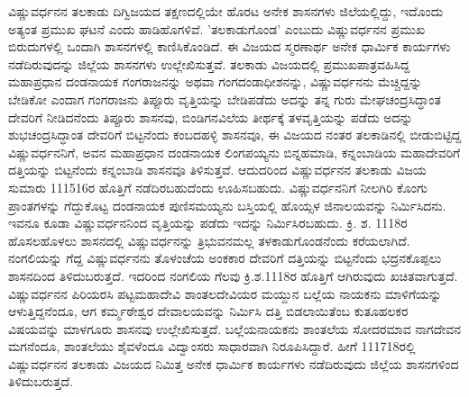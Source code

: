 ವಿಷ್ಣುವರ್ಧನನ ತಲಕಾಡು ದಿಗ್ವಿಜಯದ ತಕ್ಷಣದಲ್ಲಿಯೇ ಹೊರಟ ಅನೇಕ ಶಾಸನಗಳು ಜಿಲೆಯಲ್ಲಿದ್ದು, ಇದೊಂದು ಅತ್ಯಂತ ಪ್ರಮುಖ ಘಟನೆ ಎಂದು ಹಾಡಿಹೊಗಳಿವೆ. 'ತಲಕಾಡುಗೊಂಡ' ಎಂಬುದು ವಿಷ್ಣುವರ್ಧನನ ಪ್ರಮುಖ ಬಿರುದುಗಳಲ್ಲಿ ಒಂದಾಗಿ ಶಾಸನಗಳಲ್ಲಿ ಕಾಣಿಸಿಕೊಂಡಿದೆ. ಈ ವಿಜಯದ ಸ್ಮರಣಾರ್ಥ ಅನೇಕ ಧಾರ್ಮಿಕ ಕಾರ್ಯಗಳು ನಡೆದಿರುವುದನ್ನು ಜಿಲ್ಲೆಯ ಶಾಸನಗಳು ಉಲ್ಲೇಖಿಸುತ್ತವೆ. ತಲಕಾಡು ವಿಜಯದಲ್ಲಿ ಪ್ರಮುಖಪಾತ್ರವಹಿಸಿದ್ದ ಮಹಾಪ್ರಧಾನ ದಂಡನಾಯಕ ಗಂಗರಾಜನನ್ನು ಅಥವಾ ಗಂಗದಂಡಾಧೀಶನನ್ನು, ವಿಷ್ಣುವರ್ಧನನು ಮೆಚ್ಚಿದ್ದನ್ನು ಬೇಡಿಕೋ ಎಂದಾಗ ಗಂಗರಾಜನು ತಿಪ್ಪೂರು ವೃತ್ತಿಯನ್ನು ಬೇಡಿಪಡೆದು ಅದನ್ನು ತನ್ನ ಗುರು ಮೇಘಚಂದ್ರಸಿದ್ಧಾಂತ ದೇವರಿಗೆ ನೀಡಿದನೆಂದು ತಿಪ್ಪೂರು ಶಾಸನವು, ಬಿಂಡಿಗನವಿಲೆಯ ತೀರ್ಥಕ್ಕೆ ತಳವೃತ್ತಿಯನ್ನು ಪಡೆದು ಅದನ್ನು ಶುಭಚಂದ್ರಸಿದ್ಧಾಂತ ದೇವರಿಗೆ ಬಿಟ್ಟನೆಂದು ಕಂಬದಹಳ್ಳಿ ಶಾಸನವೂ, ಈ ವಿಜಯದ ನಂತರ ತಲಕಾಡಿನಲ್ಲಿ ಬೀಡುಬಿಟ್ಟಿದ್ದ ವಿಷ್ಣುವರ್ಧನನಿಗೆ, ಅವನ ಮಹಾಪ್ರಧಾನ ದಂಡನಾಯಕ ಲಿಂಗಪಯ್ಯನು ಬಿನ್ನಹಮಾಡಿ, ಕನ್ನಂಬಾಡಿಯ ಮಹಾದೇವರಿಗೆ ದತ್ತಿಯನ್ನು ಬಿಟ್ಟನೆಂದು ಕನ್ನಂಬಾಡಿ ಶಾಸನವೂ ತಿಳಿಸುತ್ತವೆ. ಆದುದರಿಂದ ವಿಷ್ಣುವರ್ಧನನ ತಲಕಾಡು ವಿಜಯ ಸುಮಾರು 1115\enginline{-}16ರ ಹೊತ್ತಿಗೆ ನಡೆದಿರಬಹುದೆಂದು ಊಹಿಸಬಹುದು. ವಿಷ್ಣುವರ್ಧನನಿಗೆ ನೀಲಗಿರಿ ಕೊಂಗು ಪ್ರಾಂತಗಳನ್ನು ಗೆದ್ದುಕೊಟ್ಟ ದಂಡನಾಯಕ ಪುಣಿಸಮಯ್ಯನು ಬಸ್ತಿಯಲ್ಲಿ ಹೊಯ್ಸಳ ಜಿನಾಲಯವನ್ನು ನಿರ್ಮಿಸಿದನು. ಇವನೂ ಕೂಡಾ ವಿಷ್ಣುವರ್ಧನನಿಂದ ವೃತ್ತಿಯನ್ನು ಪಡೆದು ಇದನ್ನು ನಿರ್ಮಿಸಿರಬಹುದು. ಕ್ರಿ. ಶ. 1118ರ ಹೊಸಲಹೊಳಲು ಶಾಸನದಲ್ಲಿ ವಿಷ್ಣುವರ್ಧನನ್ನು ತ್ರಿಭುವನಮಲ್ಲ ತಳಕಾಡುಗೊಂಡನೆಂದು ಕರೆಯಲಾಗಿದೆ. ನಂಗಲಿಯನ್ನು ಗೆದ್ದ ವಿಷ್ಣುವರ್ಧನನು ತೊಳಂಚೆಯ ಅಂಕಕಾರ ದೇವರಿಗೆ ದತ್ತಿಯನ್ನು ಬಿಟ್ಟನೆಂದು ಭದ್ರನಕೊಪ್ಪಲು ಶಾಸನದಿಂದ ತಿಳಿದು\-ಬರುತ್ತದೆ. ಇದರಿಂದ ನಂಗಲಿಯ ಗೆಲವು ಕ್ರಿ.ಶ.1118ರ ಹೊತ್ತಿಗೆ ಆಗಿರುವುದು ಖಚಿತವಾಗುತ್ತದೆ. ವಿಷ್ಣುವರ್ಧನನ ಪಿರಿಯರಸಿ ಪಟ್ಟಮಹಾದೇವಿ ಶಾಂತಲದೇವಿಯರ ಮಯ್ದುನ ಬಲ್ಲೆಯ ನಾಯಕನು ಮಾಳಿಗೆಯನ್ನು ಆಳುತ್ತಿದ್ದನೆಂದೂ, ಆಗ ಕರ್ಮ್ಮಠೇಶ್ವರ ದೇವಾಲಯವನ್ನು ನಿರ್ಮಿಸಿ ದತ್ತಿ ಬಿಡಲಾಯಿತೆಂಬ ಕುತೂಹಲಕರ ವಿಷಯವನ್ನು ಮಾಳಗೂರು ಶಾಸನವು ಉಲ್ಲೇಖಿಸುತ್ತದೆ. ಬಲ್ಲೆಯನಾಯಕನು ಶಾಂತಲೆಯ ಸೋದರಮಾವ ನಾಗದೇವನ ಮಗನೆಂದೂ, ಶಾಂತಲೆಯು ಶೈವಳೆಂದೂ ವಿದ್ವಾಂಸರು ಸಾಧಾರವಾಗಿ ನಿರೂಪಿಸಿದ್ದಾರೆ. ಹೀಗೆ 1117\enginline{-}18ರಲ್ಲಿ ವಿಷ್ಣುವರ್ಧನನ ತಲಕಾಡು ವಿಜಯದ ನಿಮಿತ್ತ ಅನೇಕ ಧಾರ್ಮಿಕ ಕಾರ್ಯಗಳು ನಡೆದಿರುವುದು ಜಿಲ್ಲೆಯ ಶಾಸನಗಳಿಂದ ತಿಳಿದುಬರುತ್ತದೆ.

